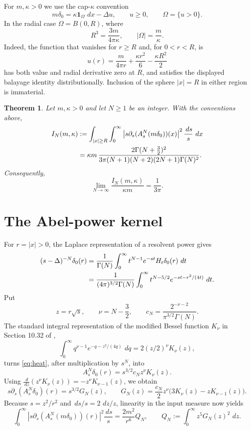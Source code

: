 \documentclass[11pt]{article}
\newtheorem{theorem}{Theorem}
\newcommand{\dd}{\,d}
\begin{document}
For $m,\kappa>0$ we use the cap-$\kappa$ convention
\[
 m\delta_0=\kappa\mathbf1_\Omega\,\dd x-\Delta u,
 \qquad u\geq0,\qquad \Omega=\{u>0\}.
\]
In the radial case $\Omega=B(0,R)$, where
\begin{equation}\label{eq:R}
 R^3=\frac{3m}{4\pi\kappa},\qquad |\Omega|=\frac m\kappa.
\end{equation}
Indeed, the function that vanishes for $r\geq R$ and, for $0<r<R$, is
\[
 u(r)=\frac{m}{4\pi r}+\frac{\kappa r^2}{6}
       -\frac{\kappa R^2}{2}
\]
has both value and radial derivative zero at $R$, and satisfies the displayed
balayage identity distributionally.  Inclusion of the sphere $|x|=R$ in
either region is immaterial.

\begin{theorem}\label{thm:main}
Let $m,\kappa>0$ and let $N\geq1$ be an integer.  With the conventions above,
\begin{align}
 I_N(m,\kappa)
 &:=\int_{|x|\geq R}\int_0^\infty
 \left|s\partial_s(A_s^N(m\delta_0))(x)\right|^2
 \frac{\dd s}{s}\,\dd x \notag\\
 &=\kappa m\,
 \frac{2\Gamma(N+\tfrac32)^2}
 {3\pi(N+1)(N+2)(2N+1)\Gamma(N)^2}.\label{eq:main}
\end{align}
Consequently,
\[
 \lim_{N\to\infty}\frac{I_N(m,\kappa)}{\kappa m}=\frac1{3\pi}.
\]
\end{theorem}

\section{The Abel-power kernel}

For $r=|x|>0$, the Laplace representation of a resolvent power gives
\begin{align}
 (s-\Delta)^{-N}\delta_0(r)
 &=\frac1{\Gamma(N)}\int_0^\infty
 t^{N-1}e^{-st}H_t\delta_0(r)\,\dd t\notag\\
 &=\frac1{(4\pi)^{3/2}\Gamma(N)}\int_0^\infty
 t^{N-5/2}e^{-st-r^2/(4t)}\,\dd t.\label{eq:heat}
\end{align}
Put
\[
 z=r\sqrt{s},\qquad \nu=N-\frac32,
 \qquad c_N=\frac{2^{-\nu-2}}{\pi^{3/2}\Gamma(N)}.
\]
The standard integral representation of the modified Bessel function
$K_\nu$ in Section 10.32 of \cite{NIST,Watson},
\[
 \int_0^\infty q^{\nu-1}e^{-q-z^2/(4q)}\,\dd q
 =2(z/2)^\nu K_\nu(z),
\]
turns \eqref{eq:heat}, after multiplication by $s^N$, into
\begin{equation}\label{eq:kernel}
 A_s^N\delta_0(r)=s^{3/2}c_Nz^\nu K_\nu(z).
\end{equation}
Using
$\frac{\dd}{\dd z}(z^\nu K_\nu(z))=-z^\nu K_{\nu-1}(z)$, we obtain
\begin{equation}\label{eq:G}
 s\partial_s(A_s^N\delta_0)(r)=s^{3/2}G_N(z),
 \qquad
 G_N(z)=\frac{c_N}{2}z^\nu
 \bigl(3K_\nu(z)-zK_{\nu-1}(z)\bigr).
\end{equation}
Because $s=z^2/r^2$ and $\dd s/s=2\,\dd z/z$, linearity in the input measure
now yields
\begin{equation}\label{eq:separate}
 \int_0^\infty
 |s\partial_s(A_s^N(m\delta_0))(r)|^2\frac{\dd s}{s}
 =\frac{2m^2}{r^6}Q_N,
 \qquad Q_N:=\int_0^\infty z^5G_N(z)^2\,\dd z.
\end{equation}
\end{document}
